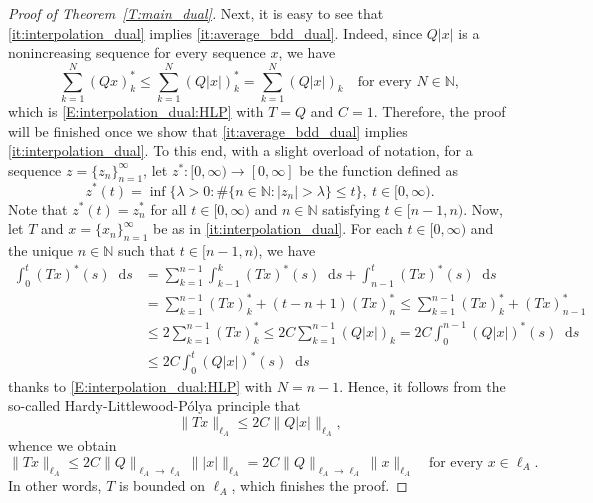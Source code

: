 \documentclass[nointlimits]{amsart}
\numberwithin{equation}{section}
\theoremstyle{plain}
\theoremstyle{definition}
\newcommand{\N}{\mathbb{N}}
\newcommand{\lA}{\ell_A}
\newcommand*\dd{\mathop{}\!\mathrm{d}}
\begin{document}
\begin{proof}[Proof of Theorem~\ref{T:main_dual}]
    Next, it is easy to see that \ref{it:interpolation_dual} implies \ref{it:average_bdd_dual}. Indeed, since $Q|x|$ is a nonincreasing sequence for every sequence $x$, we have
    \begin{equation*}
        \sum_{k=1}^N (Qx)_k^* \leq \sum_{k=1}^N (Q|x|)_k^* = \sum_{k=1}^N (Q|x|)_k \quad \text{for every $N\in\N$},
    \end{equation*}
    which is \eqref{E:interpolation_dual:HLP} with $T=Q$ and $C=1$. Therefore, the proof will be finished once we show that \ref{it:average_bdd_dual} implies \ref{it:interpolation_dual}. To this end, with a slight overload of notation, for a sequence $z=\{z_n\}_{n=1}^\infty$, let $z^*\colon[0, \infty) \to [0 ,\infty]$ be the function defined as
    \begin{equation*}
        z^*(t) = \inf\{\lambda>0: \#\{n\in\N: |z_n| > \lambda \}\leq t\},\ t\in[0, \infty).
    \end{equation*}
    Note that $z^*(t) = z^*_n$ for all $t\in[0,\infty)$ and $n\in\N$ satisfying $t\in[n-1, n)$. Now, let $T$ and $x=\{x_n\}_{n=1}^\infty$ be as in \ref{it:interpolation_dual}. For each $t\in[0, \infty)$ and the unique $n\in\N$ such that $t\in[n-1,n)$, we have
    \begin{align*}
        \int_0^t (Tx)^*(s) \dd s &= \sum_{k = 1}^{n-1} \int_{k-1}^k (Tx)^*(s) \dd s + \int_{n-1}^t (Tx)^*(s) \dd s \\
        &= \sum_{k=1}^{n-1} (Tx)_k^* + (t - n + 1)(Tx)_n^* \leq \sum_{k=1}^{n-1} (Tx)_k^* + (Tx)_{n-1}^* \\
        &\leq 2\sum_{k=1}^{n-1} (Tx)_k^* \leq 2C \sum_{k=1}^{n-1} (Q|x|)_k = 2C \int_0^{n-1} (Q|x|)^*(s) \dd s \\
        &\leq 2C \int_0^t (Q|x|)^*(s) \dd s
    \end{align*}
    thanks to \eqref{E:interpolation_dual:HLP} with $N = n-1$. 
    Hence, it follows from the so-called Hardy-Littlewood-P\'olya principle \cite[Chapter~2, Theorem~4.6]{BS} that
    \begin{equation*}
        \|Tx\|_{\lA} \leq 2C \|Q|x|\|_{\lA},
    \end{equation*}
    whence we obtain
    \begin{equation*}
        \|Tx\|_{\lA} \leq 2C\|Q\|_{\lA\to\lA} \||x|\|_{\lA} = 2C\|Q\|_{\lA\to\lA} \|x\|_{\lA} \quad \text{for every $x\in\lA$}.
    \end{equation*}
    In other words, $T$ is bounded on $\lA$, which finishes the proof. 
\end{proof}
\end{document}
